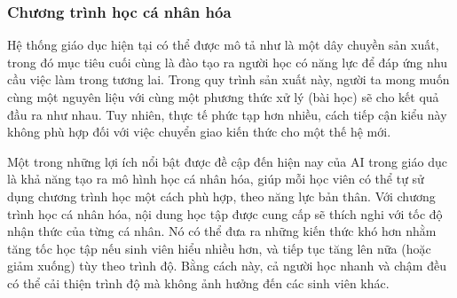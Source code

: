 \subsubsection{Chương trình học cá nhân hóa}
Hệ thống giáo dục hiện tại có thể được mô tả như là một dây chuyền sản xuất, trong đó mục tiêu cuối cùng là đào tạo ra người học có năng lực để đáp ứng nhu cầu việc làm trong tương lai. Trong quy trình sản xuất này, người ta mong muốn cùng một nguyên liệu với cùng một phương thức xử lý (bài học) sẽ cho kết quả đầu ra như nhau. Tuy nhiên, thực tế phức tạp hơn nhiều, cách tiếp cận kiểu này không phù hợp đối với việc chuyển giao kiến thức cho một thế hệ mới.\par
Một trong những lợi ích nổi bật được đề cập đến hiện nay của AI trong giáo dục là khả năng tạo ra mô hình học cá nhân hóa, giúp mỗi học viên có thể tự sử dụng chương trình học một cách phù hợp, theo năng lực bản thân. Với chương trình học cá nhân hóa, nội dung học tập được cung cấp sẽ thích nghi với tốc độ nhận thức của từng cá nhân. Nó có thể đưa ra những kiến thức khó hơn nhằm tăng tốc học tập nếu sinh viên hiểu nhiều hơn, và tiếp tục tăng lên nữa (hoặc giảm xuống) tùy theo trình độ. Bằng cách này, cả người học nhanh và chậm đều có thể cải thiện trình độ mà không ảnh hưởng đến các sinh viên khác.\par

